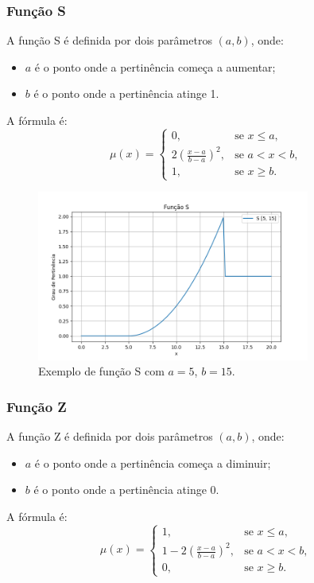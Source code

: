 \documentclass[a4paper,12pt]{article}
\begin{document}
\subsubsection{Função S}
A função S é definida por dois parâmetros $(a, b)$, onde:
\begin{itemize}
    \item $a$ é o ponto onde a pertinência começa a aumentar;
    \item $b$ é o ponto onde a pertinência atinge 1.
\end{itemize}
A fórmula é:
\[
\mu(x) =
\begin{cases}
0, & \text{se } x \leq a, \\
2\left(\frac{x - a}{b - a}\right)^2, & \text{se } a < x < b, \\
1, & \text{se } x \geq b.
\end{cases}
\]
\begin{figure}[H]
    \centering
    \includegraphics[width=0.8\textwidth]{img/s.png}
    \caption{Exemplo de função S com $a=5$, $b=15$.}
    \label{fig:funcao_s}
\end{figure}

\subsubsection{Função Z}
A função Z é definida por dois parâmetros $(a, b)$, onde:
\begin{itemize}
    \item $a$ é o ponto onde a pertinência começa a diminuir;
    \item $b$ é o ponto onde a pertinência atinge 0.
\end{itemize}
A fórmula é:
\[
\mu(x) =
\begin{cases}
1, & \text{se } x \leq a, \\
1 - 2\left(\frac{x - a}{b - a}\right)^2, & \text{se } a < x < b, \\
0, & \text{se } x \geq b.
\end{cases}
\]
\end{document}
